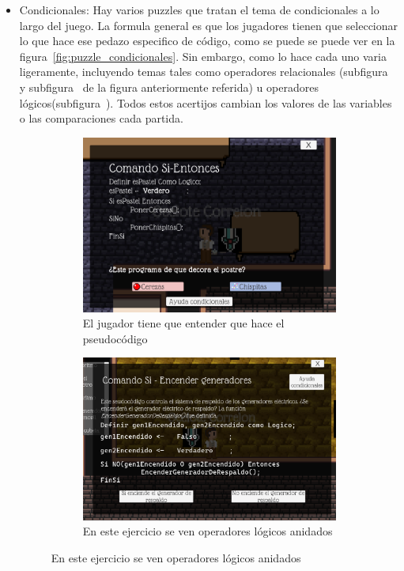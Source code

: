 \begin{itemize}
    \item Condicionales: Hay varios puzzles que tratan el tema de condicionales a lo largo del juego. La formula general es que los jugadores tienen que seleccionar lo que hace ese pedazo especifico de código, como se puede se puede ver en la figura~\ref{fig:puzzle_condicionales}. Sin embargo, como lo hace cada uno varia ligeramente, incluyendo temas tales como operadores relacionales (subfigura~ y subfigura~ de la figura anteriormente referida) u operadores lógicos(subfigura~). Todos estos acertijos cambian los valores de las variables o las comparaciones cada partida.
    \begin{figure}[H]
        \centering
        \caption{Capturas de pantalla de los diversos ejercicios de condicionales en el juego}
        \label{fig:puzzle_condicionales}
        \begin{subfigure}{\textwidth}
            \centering
            \includegraphics[width=0.5\linewidth]{images/Puzzlecondicional1.png}
            \caption{El jugador tiene que entender que hace el pseudocódigo}
            \label{fig:puzzle_condicionales1}
        \end{subfigure}
        \begin{subfigure}{\textwidth}
            \centering
            \includegraphics[width=0.5\linewidth]{images/Puzzlecondicional2.png}
            \caption{En este ejercicio se ven operadores lógicos anidados}
            \label{fig:puzzle_condicionales2}
        \end{subfigure}
    \end{figure}

\end{itemize}

